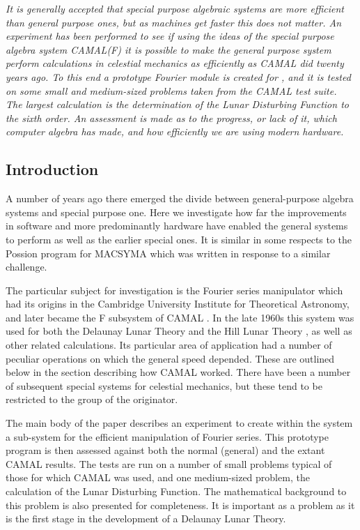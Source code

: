 \emph{It is generally accepted that special purpose algebraic systems
are more efficient than general purpose ones, but as machines get
faster this does not matter.  An experiment has been performed to see
if using the ideas of the special purpose algebra system CAMAL(F) it
is possible to make the general purpose system \REDUCE perform
calculations in celestial mechanics as efficiently as CAMAL did twenty
years ago.  To this end a prototype Fourier module is created for
\REDUCE, and it is tested on some small and medium-sized problems taken
from the CAMAL test suite. The largest calculation is the
determination of the Lunar Disturbing Function to the sixth order.  An
assessment is made as to the progress, or lack of it, which computer
algebra has made, and how efficiently we are using modern hardware.
}


\subsection{Introduction}

A number of years ago there emerged the divide between general-purpose
algebra systems and special purpose one.  Here we investigate how far
the improvements in software and more predominantly hardware have
enabled the general systems to perform as well as the earlier special
ones.  It is similar in some respects to the Possion program for
MACSYMA \cite{Fateman:74a} which was written in response to a similar
challenge.

The particular subject for investigation is the Fourier series
manipulator which had its origins in the Cambridge University
Institute for Theoretical Astronomy, and later became the F subsystem
of CAMAL \cite{Barton67b,CAMALF:83}.  In the late 1960s this system was
used for both the Delaunay Lunar Theory \cite{Delaunay:1860,Barton67a} and
the Hill Lunar Theory \cite{Bourne:72}, as well as other related
calculations.  Its particular area of application had a number of
peculiar operations on which the general speed depended.  These are
outlined below in the section describing how CAMAL worked.  There have
been a number of subsequent special systems for celestial mechanics,
but these tend to be restricted to the group of the originator.

The main body of the paper describes an experiment to create within
the \REDUCE system a sub-system for the efficient manipulation of
Fourier series.  This prototype program is then assessed against both
the normal (general) \REDUCE and the extant CAMAL results.  The tests
are run on a number of small problems typical of those for which CAMAL
was used, and one medium-sized problem, the calculation of the Lunar
Disturbing Function.  The mathematical background to this problem is
also presented for completeness.  It is important as a problem as it
is the first stage in the development of a Delaunay Lunar Theory.

